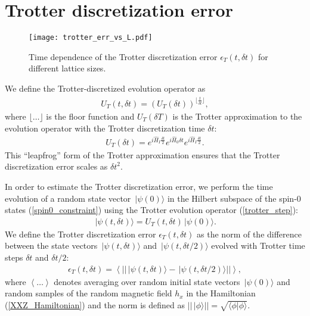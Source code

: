 \documentclass[10pt,amsmath,amssymb,twocolumn,superscriptaddress,groupedaddress,nofootinbib,aps,prd,twocolumn]{revtex4-1}
\newcommand{\lr}[1]{\left(#1\right)}
\newcommand{\vev}[1]{\left\langle #1 \right\rangle}
\newcommand{\ket}[1]{ \, | #1 \rangle }
\newcommand{\braket}[2]{ \langle #1 | #2 \rangle }
\newcommand{\floor}[1]{\lfloor #1 \rfloor}
\begin{document}
\section{Trotter discretization error}
\label{sec:trotter_err}

\begin{figure*}[h!pb]
  \centering
  \texttt{[image: trotter\_err\_vs\_L.pdf]}\\
  \caption{Time dependence of the Trotter discretization error $\epsilon_T\lr{t, {\delta t}}$ for different lattice sizes.}
  \label{fig:trotter_err_vs_L}
\end{figure*}

We define the Trotter-discretized evolution operator as
\begin{eqnarray}
\label{trotter_evolution}
 U_T\lr{t, {\delta t}} = \lr{U_T\lr{\delta t}}^{\floor{\frac{t}{\delta t}}} ,
\end{eqnarray}
where $\floor{\ldots}$ is the floor function and $U_T\lr{\delta T}$ is the Trotter approximation to the evolution operator with the Trotter discretization time $\delta t$:
\begin{eqnarray}
\label{trotter_step}
 U_T\lr{\delta t} = e^{i \hat{H}_I \frac{\delta t}{2} } e^{i \hat{H}_0 {\delta t}} e^{i \hat{H}_I \frac{\delta t}{2} } .
\end{eqnarray}
This ``leapfrog'' form of the Trotter approximation ensures that the Trotter discretization error scales as ${\delta t}^2$.

In order to estimate the Trotter discretization error, we perform the time evolution of a random state vector $\ket{\psi\lr{0}}$ in the Hilbert subspace of the spin-0 states (\ref{spin0_constraint}) using the Trotter evolution operator (\ref{trotter_step}):
\begin{eqnarray}
\label{trotter_state_evolution}
 \ket{\psi\lr{t, {\delta t}}} = U_T\lr{t, {\delta t}} \ket{\psi\lr{0}} .
\end{eqnarray}
We define the Trotter discretization error $\epsilon_T\lr{t, {\delta t}}$ as the norm of the difference between the state vectors $\ket{\psi\lr{t, {\delta t}}}$ and $\ket{\psi\lr{t, {\delta t}/2}}$ evolved with Trotter time steps ${\delta t}$ and ${\delta t}/2$:
\begin{eqnarray}
\label{trotter_err_def}
 \epsilon_T\lr{t, {\delta t}} = \vev{|| \ket{\psi\lr{t, {\delta t}}} - \ket{\psi\lr{t, {\delta t}/2}} || } ,
\end{eqnarray}
where $\vev{\ldots}$ denotes averaging over random initial state vectors $\ket{\psi\lr{0}}$ and random samples of the random magnetic field $h_x$ in the Hamiltonian (\ref{XXZ_Hamiltonian}) and the norm is defined as $|| \ket{\phi} || = \sqrt{\braket{\phi}{\phi}}$.
\end{document}
